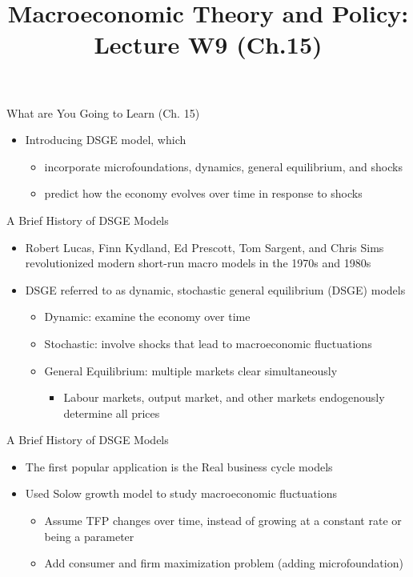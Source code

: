\documentclass[aspectratio=1610]{beamer}
\title[Winter - Lecture 9] %
{Macroeconomic Theory and Policy: Lecture  W9 (Ch.15)}
\author[University of Toronto] %
{}
\date[] %
\begin{document}
\begin{frame}
  \titlepage
\end{frame}

\begin{frame}[wide]{What are You Going to Learn (Ch. 15)}
	\begin{itemize}
		\item Introducing DSGE model, which
		\begin{itemize}
			\item incorporate microfoundations, dynamics, general equilibrium, and shocks
			\item predict how the economy evolves over time in response to shocks
		\end{itemize}
	\end{itemize}
\end{frame}

\begin{frame}[wide]{A Brief History of DSGE Models}
	\begin{itemize}
		\item Robert Lucas, Finn Kydland, Ed Prescott, Tom Sargent, and Chris Sims revolutionized modern short-run macro models in the 1970s and 1980s
		\item DSGE referred to as dynamic, stochastic general equilibrium (DSGE) models
		\begin{itemize}
			\item Dynamic: examine the economy over time
			\item Stochastic: involve shocks that lead to macroeconomic fluctuations
			\item General Equilibrium: multiple markets clear simultaneously
			\begin{itemize}
				\item Labour markets, output market, and other markets endogenously determine all prices
			\end{itemize}
		\end{itemize}
	\end{itemize}
\end{frame}

\begin{frame}[wide]{A Brief History of DSGE Models}
	\begin{itemize}
		\item The first popular application is the Real business cycle models
		\item Used Solow growth model to study macroeconomic fluctuations
		\begin{itemize}
			\item Assume TFP changes over time, instead of growing at a constant rate or being a parameter 
			\item Add consumer and firm maximization problem (adding microfoundation)
		\end{itemize}
	\end{itemize}
\end{frame}
\end{document}
